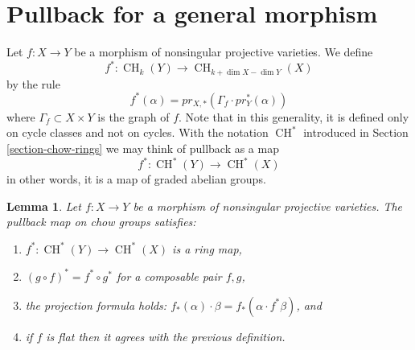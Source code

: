 \documentclass{stacks-project}
\theoremstyle{plain}
\newtheorem{lemma}[subsection]{Lemma}
\theoremstyle{definition}
\theoremstyle{remark}
\numberwithin{equation}{subsection}
\def\CH{\mathop{\mathrm{CH}}\nolimits}
\begin{document}
\section{Pullback for a general morphism}
\label{section-general-pullback}

\noindent
Let $f : X \to Y$ be a morphism of nonsingular projective varieties.
We define
$$
f^* : \CH_k(Y) \to \CH_{k+\dim X - \dim Y}(X)
$$
by the rule
$$
f^*(\alpha) = pr_{X, *}(\Gamma_f \cdot pr_Y^*(\alpha))
$$
where $\Gamma_f \subset X\times Y$ is the graph of $f$. Note that in this
generality, it is defined only on cycle classes and not on cycles. With the
notation $\CH^*$ introduced in Section \ref{section-chow-rings}
we may think of pullback as a map
$$
f^* : \CH^*(Y) \to \CH^*(X)
$$
in other words, it is a map of graded abelian groups.

\begin{lemma}
\label{lemma-pullback-and-intersection-product}
Let $f : X \to Y$ be a morphism of nonsingular projective varieties.
The pullback map on chow groups satisfies:
\begin{enumerate}
\item $f^* : \CH^*(Y) \to \CH^*(X)$ is a ring map,
\item $(g \circ f)^* = f^* \circ g^*$ for a composable pair $f, g$,
\item the projection formula holds: $f_*(\alpha) \cdot \beta =
f_*( \alpha \cdot f^*\beta)$, and
\item if $f$ is flat then it agrees with the previous definition.
\end{enumerate}
\end{lemma}
\end{document}
